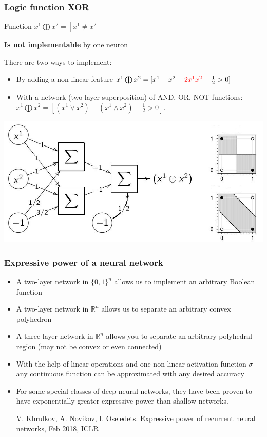\documentclass[fullscreen=true, bookmarks=true, hyperref={pdfencoding=unicode}]{beamer}
\begin{document}
\begin{frame}
  \frametitle{Logic function XOR}
  Function $x^1 \bigoplus x^2 = [x^1 \neq x^2]$ 

  {\bf Is not implementable} by one neuron
  
  \pause
  There are two ways to implement:
  \begin{itemize}
      \item By adding a non-linear feature
      $x^1 \bigoplus x^2 = [x^1 + x^2 - { \color{red}2x^1 x^2} - \frac12 > 0]$
      \item With a network (two-layer superposition) of AND, OR, NOT functions:
      $x^1 \bigoplus x^2 = [(x^1 \vee x^2) - (x^1 \wedge x^2) - \frac12 > 0]$.
  \end{itemize}

\begin{center}
  \includegraphics[keepaspectratio, width=.7\paperwidth]{xor_nn.jpg}
\end{center}

\end{frame}


\begin{frame}
  \frametitle{Expressive power of a neural network}
  \begin{itemize}
      \item A two-layer network in $\{0, 1\}^n$ allows us to implement an arbitrary Boolean function
      \pause
      \item A two-layer network in $\mathbb{R}^n$ allows us to separate an arbitrary convex polyhedron
      \pause
      \item A three-layer network in $\mathbb{R}^n$ allows you to separate an arbitrary polyhedral region (may not be convex or even connected)
      \pause
      \item With the help of linear operations and one non-linear activation function $\sigma$ any continuous function can be approximated with any desired accuracy
      \pause
      \item For some special classes of deep neural networks, they have been proven to have exponentially greater expressive power than shallow networks. 

      {\small
      \href{https://arxiv.org/pdf/1711.00811.pdf}{V. Khrulkov, A. Novikov, I. Oseledets. Expressive power of recurrent neural networks, Feb 2018, ICLR}}
  \end{itemize}
\end{frame}
\end{document}
